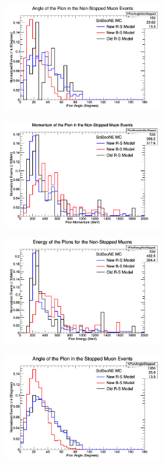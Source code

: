 \documentclass[11pt]{article}
\begin{document}
\begin{figure}[H]
\centering
\includegraphics[width=0.6\textwidth]{NMPionPlottingImages/1-NMPionPlotting.png}
\caption{}
\end{figure}

\begin{figure}[H]
\centering
\includegraphics[width=0.6\textwidth]{NMPionPlottingImages/2-NMPionPlotting.png}
\caption{}
\end{figure}

\begin{figure}[H]
\centering
\includegraphics[width=0.6\textwidth]{NMPionPlottingImages/3-NMPionPlotting.png}
\caption{}
\end{figure}

\begin{figure}[H]
\centering
\includegraphics[width=0.6\textwidth]{NMPionPlottingImages/4-NMPionPlotting.png}
\caption{}
\end{figure}
\end{document}

